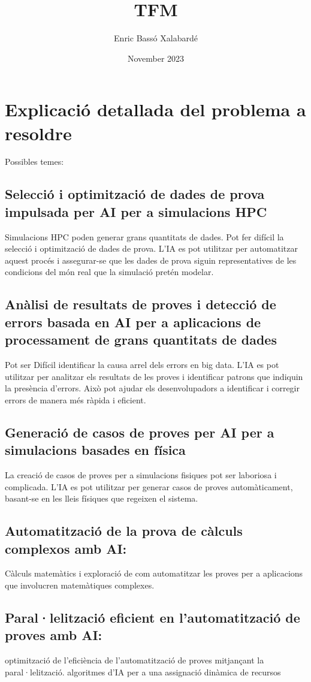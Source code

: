 \documentclass{article}
\title{TFM}
\author{Enric Bassó Xalabardé}
\date{November 2023}
\begin{document}
\maketitle
\tableofcontents

\section{Explicació detallada del problema a resoldre}
Possibles temes:
\subsection{Selecció i optimització de dades de prova impulsada per AI per a simulacions HPC}
Simulacions HPC poden generar grans quantitats de dades. Pot fer difícil la selecció i optimització de dades de prova. L'IA es pot utilitzar per automatitzar aquest procés i assegurar-se que les dades de prova siguin representatives de les condicions del món real que la simulació pretén modelar.

\subsection{Anàlisi de resultats de proves i detecció de errors basada en AI per a aplicacions de processament de grans quantitats de dades}
Pot ser Difícil identificar la causa arrel dels errors en big data. L'IA es pot utilitzar per analitzar els resultats de les proves i identificar patrons que indiquin la presència d'errors. Això pot ajudar els desenvolupadors a identificar i corregir errors de manera més ràpida i eficient.

\subsection{Generació de casos de proves per AI per a simulacions basades en física}
La creació de casos de proves per a simulacions fisiques pot ser laboriosa i complicada. L'IA es pot utilitzar per generar casos de proves automàticament, basant-se en les lleis físiques que regeixen el sistema.

\subsection{Automatització de la prova de càlculs complexos amb AI:}
Càlculs matemàtics i exploració de com automatitzar les proves per a aplicacions que involucren matemàtiques complexes.

\subsection{Paral·lelització eficient en l'automatització de proves amb AI:}
optimització de l'eficiència de l'automatització de proves mitjançant la paral·lelització.
algoritmes d'IA per a una assignació dinàmica de recursos
\end{document}
